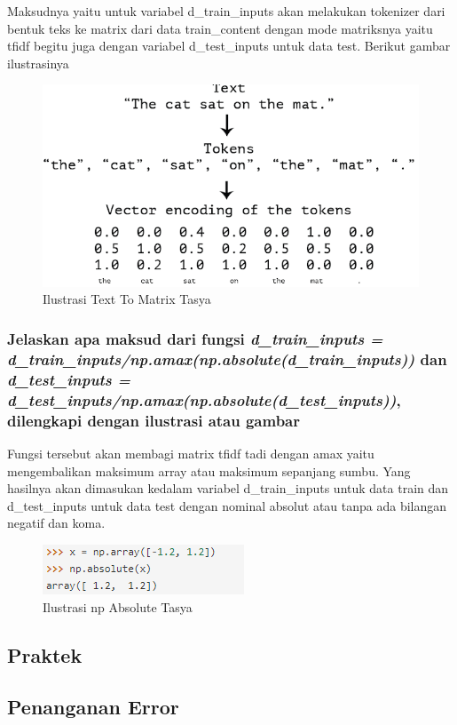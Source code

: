 Maksudnya yaitu untuk variabel d\_train\_inputs akan melakukan tokenizer dari bentuk teks ke matrix dari data train\_content dengan mode matriksnya yaitu tfidf begitu juga dengan variabel d\_test\_inputs untuk data test. Berikut gambar ilustrasinya
\begin{figure}[ht]
\centering
\includegraphics[scale=0.5]{figures/Chapter 7/1164086/Teori/chapter7tasya2.png}
\caption{Ilustrasi Text To Matrix Tasya}
\label{Teori}
\end{figure}

\subsubsection{Jelaskan apa maksud dari fungsi \emph{d\_train\_inputs = d\_train\_inputs/np.amax(np.absolute(d\_train\_inputs))} dan \emph{d\_test\_inputs = d\_test\_inputs/np.amax(np.absolute(d\_test\_inputs))}, dilengkapi dengan ilustrasi atau gambar}

Fungsi tersebut akan membagi matrix tfidf tadi dengan amax yaitu mengembalikan maksimum array atau maksimum sepanjang sumbu. Yang hasilnya akan dimasukan kedalam variabel d\_train\_inputs untuk data train dan d\_test\_inputs untuk data test dengan nominal absolut atau tanpa ada bilangan negatif dan koma.
\begin{figure}[ht]
\centering
\includegraphics[scale=0.5]{figures/Chapter 7/1164086/Teori/chapter7tasya4.png}
\caption{Ilustrasi np Absolute Tasya}
\label{Teori}
\end{figure}



\subsection{Praktek}


\subsection{Penanganan Error}

